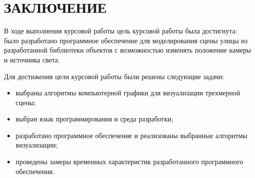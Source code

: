 \chapter*{ЗАКЛЮЧЕНИЕ}

В ходе выполнения курсовой работы цель курсовой работы была достигнута:
было разработано программное обеспечение для моделирования сцены улицы из
разработанной библиотеки объектов с возможностью изменять положение камеры
и источника света.

Для достижения цели курсовой работы были решены следующие задачи:
\begin{itemize}
    \item выбраны алгоритмы компьютерной графики для визуализации трехмерной
        сцены;
    \item выбран язык программирования и среда разработки;
    \item разработано программное обеспечение и реализованы выбранные
        алгоритмы визуализации;
    \item проведены замеры временных характеристик
        разработанного программного обеспечения.
\end{itemize}

